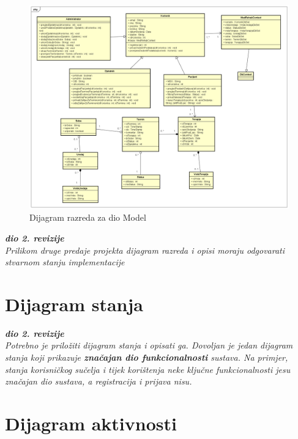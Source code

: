 			\begin{figure}[H]
				\includegraphics[scale=0.3]{slike/Dijagram_razreda_1.PNG} %
				\centering
				\caption{Dijagram razreda za dio Model}
				\label{fig:dijagram_razreda_3}
			\end{figure}
			
			
			
			\textbf{\textit{dio 2. revizije}}\\			
			
			\textit{Prilikom druge predaje projekta dijagram razreda i opisi moraju odgovarati stvarnom stanju implementacije}
			
			
			
			\eject
		
		\section{Dijagram stanja}
			
			
			\textbf{\textit{dio 2. revizije}}\\
			
			\textit{Potrebno je priložiti dijagram stanja i opisati ga. Dovoljan je jedan dijagram stanja koji prikazuje \textbf{značajan dio funkcionalnosti} sustava. Na primjer, stanja korisničkog sučelja i tijek korištenja neke ključne funkcionalnosti jesu značajan dio sustava, a registracija i prijava nisu. }
			
			
			\eject 
		
		\section{Dijagram aktivnosti}
			
